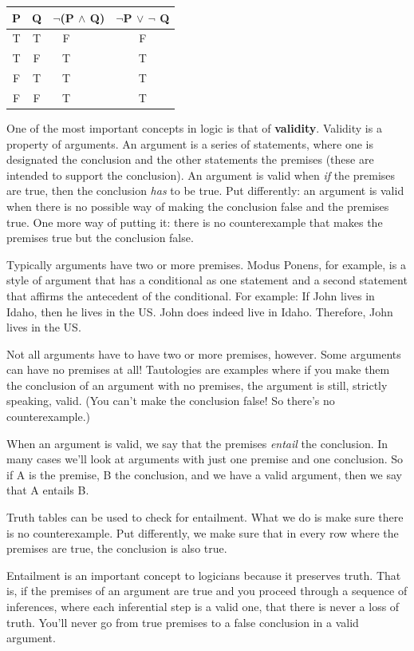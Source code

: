 \documentclass[]{tufte-book}
\begin{document}
\begin{longtable}[]{@{}cccc@{}}
\toprule
P & Q & \(\neg\)(P \(\wedge\) Q) & \(\neg\)P \(\vee\) \(\neg\) Q\tabularnewline
\midrule
\endhead
T & T & F\(~~~~~~~~~~\) & F\tabularnewline
T & F & T\(~~~~~~~~~~\) & T\tabularnewline
F & T & T\(~~~~~~~~~~\) & T\tabularnewline
F & F & T\(~~~~~~~~~~\) & T\tabularnewline
\bottomrule
\end{longtable}

One of the most important concepts in logic is that of \textbf{validity}. Validity is a property of arguments. An argument is a series of statements, where one is designated the conclusion and the other statements the premises (these are intended to support the conclusion). An argument is valid when \emph{if} the premises are true, then the conclusion \emph{has} to be true. Put differently: an argument is valid when there is no possible way of making the conclusion false and the premises true. One more way of putting it: there is no counterexample that makes the premises true but the conclusion false.

Typically arguments have two or more premises. Modus Ponens, for example, is a style of argument that has a conditional as one statement and a second statement that affirms the antecedent of the conditional. For example: If John lives in Idaho, then he lives in the US. John does indeed live in Idaho. Therefore, John lives in the US.

Not all arguments have to have two or more premises, however. Some arguments can have no premises at all! Tautologies are examples where if you make them the conclusion of an argument with no premises, the argument is still, strictly speaking, valid. (You can't make the conclusion false! So there's no counterexample.)

When an argument is valid, we say that the premises \emph{entail} the conclusion. In many cases we'll look at arguments with just one premise and one conclusion. So if A is the premise, B the conclusion, and we have a valid argument, then we say that A entails B.

Truth tables can be used to check for entailment. What we do is make sure there is no counterexample. Put differently, we make sure that in every row where the premises are true, the conclusion is also true.

Entailment is an important concept to logicians because it preserves truth. That is, if the premises of an argument are true and you proceed through a sequence of inferences, where each inferential step is a valid one, that there is never a loss of truth. You'll never go from true premises to a false conclusion in a valid argument.
\end{document}
